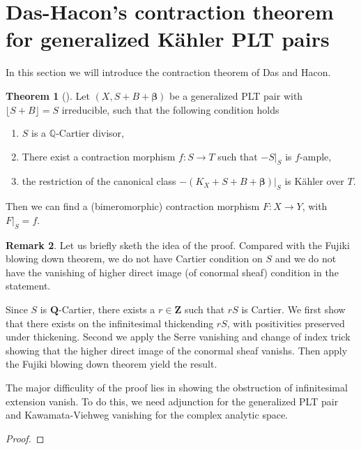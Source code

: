 \documentclass[11pt]{article}
\theoremstyle{definition}
\newtheorem{theorem}{Theorem}
\newtheorem{remark}[theorem]{Remark}
\begin{document}
	\section{Das-Hacon's contraction theorem for generalized K\"ahler PLT pairs}
	In this section we will introduce the contraction theorem of Das and Hacon. 
	\begin{theorem}[{\cite[Theorem 5.8]{DH24}}]
		Let $(X, S+B + \boldsymbol\beta)$ be a generalized PLT pair with $\lfloor S+B\rfloor=S$ irreducible, such that the following condition holds
		\begin{enumerate}
			\item $S$ is a $\mathbb{Q}$-Cartier divisor,
			\item There exist a contraction morphism $f: S\to T$ such that $-S|_S$ is $f$-ample,
			\item the restriction of the canonical class $-(K_X+S+B+\boldsymbol{\beta})|_S$ is K\"ahler over $T$.
		\end{enumerate}
		Then we can find a (bimeromorphic) contraction morphism $F:X\to Y$, with $F|_S = f$.
	\end{theorem}
	\begin{remark}
		Let us briefly sketh the idea of the proof. Compared with the Fujiki blowing down theorem, we do not have Cartier condition on $S$ and we do not have the vanishing of higher direct image (of conormal sheaf) condition in the statement. 
		
		Since $S$ is $\mathbf{Q}$-Cartier, there exists a $r \in \mathbf{Z}$ such that $rS$ is Cartier. We first show that there exists on the infinitesimal thickending $rS$, with positivities preserved under thickening. Second we apply the Serre vanishing and change of index trick showing that the higher direct image of the conormal sheaf vanishs. Then apply the Fujiki blowing down theorem yield the result.
		
		The major difficulity of the proof lies in showing the obstruction of infinitesimal extension vanish. To do this, we need adjunction for the generalized PLT pair and Kawamata-Viehweg vanishing for the complex analytic space. 
	\end{remark}
	\begin{proof}
		
	\end{proof}
	
\end{document}
